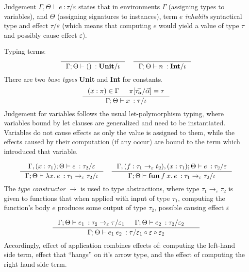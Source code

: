 \documentclass[declaration,shortabstract]{iithesis}
\theoremstyle{definition} \newtheorem{definition}{Definition}[section]
\newcommand{\types}[4][\Gamma;\Theta]{\ensuremath{{{#1} \vdash {#2} \: : {#3}/{#4}}}}
\newcommand{\arrow}[3]{{#1}\rightarrow_{#2}{#3}}
\newcommand{\lam}[1][x]{\ensuremath{\lambda #1.\:}}
\begin{document}
Judgement $\types[\Gamma, \Theta]{e}{\tau}{\varepsilon}$ states that in environments $\Gamma$ (assigning types to variables),
and $\Theta$ (assigning signatures to instances), term $e$ \textit{inhabits} syntactical type and effect $\tau / \varepsilon$ (which means that computing $e$ would yield a value of type $\tau$ and possibly cause effect $\varepsilon$).

Typing terms:
$$
\inference{}{\types{()}{\textbf{Unit}}{\iota}}
\quad
\inference{}{\types{n}{\textbf{Int}}{\iota}}{}
$$
\setlength{\jot}{10pt}
There are two \textit{base types} \textbf{Unit} and \textbf{Int} for constants.
$$
\inference{(x : \pi) \in \Gamma & \pi[\vec{\tau_\alpha} / \vec{\alpha}] = \tau}{\types{x}{\tau}{\iota}}
$$
Judgement for variables follows the usual let-polymorphism typing, 
where variables bound by let clauses are generalized and need to be instantiated.
Variables do not cause effects as only the value is assigned to them,
while the effects caused by their computation (if any occur)
are bound to the term which introduced that variable.

$$
\inference{
    \types[\Gamma,(x : \tau_1); \Theta]{e}{\tau_2}{\varepsilon} 
}{
    \types{\lam e}{\arrow{\tau_1}{\varepsilon}{\tau_2}}{\iota}
}
\quad
\inference{
    \types[\Gamma, (f : \arrow{\tau_1}{\varepsilon}{t_2}),(x : \tau_1); \Theta]{e}{\tau_2}{\varepsilon} 
}{
    \types{\textbf{fun}\:f\:x.\: e}{\arrow{\tau_1}{\varepsilon}{\tau_2}}{\iota}
}
$$
The \textit{type constructor} $\rightarrow$ is used to type abstractions,
where type $\arrow{\tau_1}{\varepsilon}{\tau_2}$ is given to functions
that when applied with input of type $\tau_1$, computing the function's body $e$ produces some output of type $\tau_2$, possible causing effect $\varepsilon$

$$
\inference{
    \types{e_1}{\arrow{\tau_2}{\varepsilon}{\tau}}{\varepsilon_1} &
    \types{e_2}{\tau_2}{\varepsilon_2} &
}{
    \types{e_1\:e_2}{\tau}{\varepsilon_1 \circ \varepsilon \circ \varepsilon_2}
}
$$
Accordingly, effect of application combines effects of: computing the left-hand side term,
effect that ``hangs'' on it's arrow type, and the effect of computing the right-hand side term.
\end{document}
